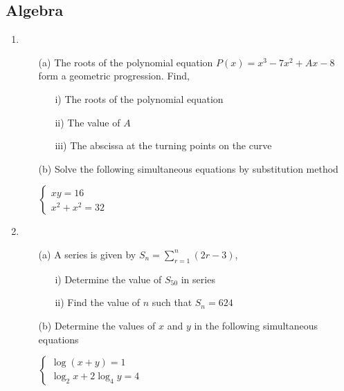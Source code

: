 \subsection{Algebra}

\begin{enumerate}
	\item 
	\begin{enumerate}[topsep=0ex,itemsep=0ex,partopsep=1ex,parsep=1ex]
		\item[(a)] The roots of the polynomial equation $P(x) = x^3 - 7x^2 + Ax - 8$ form a geometric progression. Find, 
		\begin{enumerate}[topsep=0ex,itemsep=0ex,partopsep=1ex,parsep=1ex]
			\item[i)] The roots of the polynomial equation
			\item[ii)] The value of $A$
			\item[iii)] The abscissa at the turning points on the curve
		\end{enumerate}
		
		\item[(b)] Solve the following simultaneous equations by substitution method 
		\begin{center}
			$ \left\{ \begin{array}{l}
			xy = 16 \\
			x^2 + x^2 = 32
			\end{array} \right.$
		\end{center}
	\end{enumerate}
	
	\item
	\begin{enumerate}[topsep=0ex,itemsep=0ex,partopsep=1ex,parsep=1ex]
		\item[(a)] A series is given by $S_n = \sum_{r=1}^n (2r - 3)$,
		\begin{enumerate}[topsep=0ex,itemsep=0ex,partopsep=1ex,parsep=1ex]
			\item[i)] Determine the value of $S_{50}$ in series
			\item[ii)] Find the value of $n$ such that $S_{n} = 624$
		\end{enumerate}
		
		\item[(b)] Determine the values of $x$ and $y$ in the following simultaneous equations
		\begin{center}
			$ \left\{ \begin{array}{l}
			\log(x + y) = 1 \\
			\log_2{x} + 2\log_4{y} = 4
			\end{array} \right.$
		\end{center}
	\end{enumerate}


\end{enumerate}

